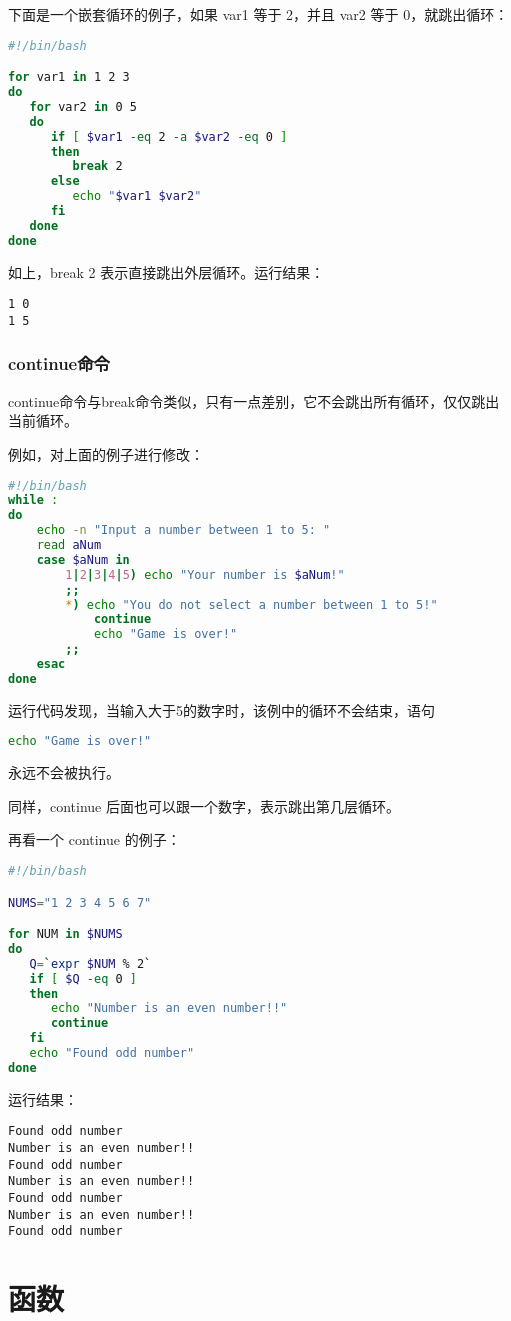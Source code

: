 下面是一个嵌套循环的例子，如果 var1 等于 2，并且 var2 等于 0，就跳出循环：
\begin{lstlisting}[language=sh]
#!/bin/bash

for var1 in 1 2 3
do
   for var2 in 0 5
   do
      if [ $var1 -eq 2 -a $var2 -eq 0 ]
      then
         break 2
      else
         echo "$var1 $var2"
      fi
   done
done
\end{lstlisting}
如上，break 2 表示直接跳出外层循环。运行结果：
\begin{verbatim}
1 0
1 5
\end{verbatim}


\subsubsection{continue命令}
continue命令与break命令类似，只有一点差别，它不会跳出所有循环，仅仅跳出当前循环。

例如，对上面的例子进行修改：
\begin{lstlisting}[language=sh]
#!/bin/bash
while :
do
    echo -n "Input a number between 1 to 5: "
    read aNum
    case $aNum in
        1|2|3|4|5) echo "Your number is $aNum!"
        ;;
        *) echo "You do not select a number between 1 to 5!"
            continue
            echo "Game is over!"
        ;;
    esac
done
\end{lstlisting}
运行代码发现，当输入大于5的数字时，该例中的循环不会结束，语句
\begin{lstlisting}[language=sh]
echo "Game is over!"
\end{lstlisting}
永远不会被执行。

同样，continue 后面也可以跟一个数字，表示跳出第几层循环。

再看一个 continue 的例子：
\begin{lstlisting}[language=sh]
#!/bin/bash

NUMS="1 2 3 4 5 6 7"

for NUM in $NUMS
do
   Q=`expr $NUM % 2`
   if [ $Q -eq 0 ]
   then
      echo "Number is an even number!!"
      continue
   fi
   echo "Found odd number"
done
\end{lstlisting}
运行结果：
\begin{verbatim}
Found odd number
Number is an even number!!
Found odd number
Number is an even number!!
Found odd number
Number is an even number!!
Found odd number
\end{verbatim}



\section{函数}
